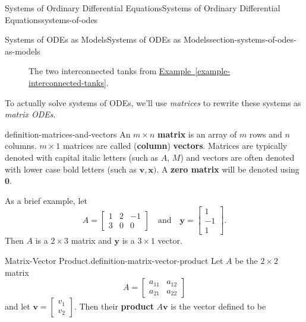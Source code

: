 \documentclass[oneside,10pt,]{book}
\newcommand{\terminology}[1]{\textbf{#1}}
\numberwithin{equation}{section}
\renewcommand{\vec}[1]{\mathbf{#1}}
\newcommand{\amp}{&}
\begin{document}
\begin{chapterptx}{Systems of Ordinary Differential Equations}{}{Systems of Ordinary Differential Equations}{}{}{systems-of-odes}
\begin{sectionptx}{Systems of ODEs as Models}{}{Systems of ODEs as Models}{}{}{section-systems-of-odes-as-models}
\begin{figure}
{
}
\caption{The two interconnected tanks from \hyperref[example-interconnected-tanks]{Example~\ref{example-interconnected-tanks}}.\label{figure-interconnected-tanks}}
\end{figure}
\hypertarget{p-303}{}%
To actually solve systems of ODEs, we'll use \emph{matrices} to rewrite these systems as \emph{matrix ODEs}.%
\begin{definition}{}{definition-matrices-and-vectors}%
\hypertarget{p-304}{}%
An \(m\times n\) \terminology{matrix} is an array of \(m\) rows and \(n\) columns. \(m\times1\) matrices are called (\terminology{column}) \terminology{vectors}. Matrices are typically denoted with capital italic letters (such as \(A\), \(M\)) and vectors are often denoted with lower case bold letters (such as \(\vec{v},\vec{x})\). A \terminology{zero matrix} will be denoted using \(\vec{0}\).%
\end{definition}
\hypertarget{p-305}{}%
As a brief example, let%
\begin{equation*}
A = \begin{bmatrix} 1\amp2\amp-1\\3\amp0\amp0\end{bmatrix}\quad\text{and}\quad \vec{y} = \begin{bmatrix} 1\\-1\\1 \end{bmatrix}.
\end{equation*}
Then \(A\) is a \(2\times3\) matrix and \(\vec{y}\) is a \(3\times 1\) vector.%
\begin{definition}{Matrix-Vector Product.}{definition-matrix-vector-product}%
\hypertarget{p-306}{}%
Let \(A\) be the \(2\times 2\) matrix%
\begin{equation*}
A = \begin{bmatrix} a_{11}\amp a_{12}\\a_{21}\amp a_{22} \end{bmatrix}
\end{equation*}
and let \(\vec{v} = \begin{bmatrix} v_{1}\\v_{2} \end{bmatrix}\). Then their \terminology{product} \(A\vec{v}\) is the vector defined to be%

\end{definition}
\end{sectionptx}
\end{chapterptx}
\end{document}
